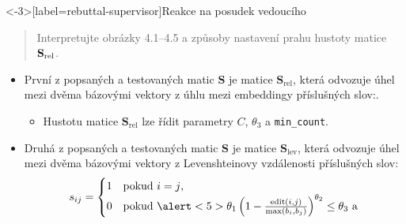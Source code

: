 \documentclass[aspectratio=169,t]{beamer}
\begin{document}
\begin{frame}<-3>[label=rebuttal-supervisor]{Reakce na posudek vedoucího}
\vspace*{-.1cm}
\begin{quote}
\alert<1>{Interpretujte obrázky 4.1--4.5} a způsoby nastavení prahu
\alert<1>{hustoty matice $\mathbf{S}_{\text{\textup{rel}}}$}.
\end{quote}
\vspace*{-.1cm}
\begin{itemize}
  \item<2-> První z popsaných a testovaných matic $\mathbf S$ je \alert<2>{matice
    $\mathbf{S}_{\text{rel}}$}, která \alert<2>{odvozuje úhel mezi dvěma
    bázovými vektory z úhlu mezi embeddingy příslušných slov}:.
    \begin{itemize}
      \item<3-> \alert<3>{Hustotu} matice $\mathbf{S}_{\text{rel}}$ \alert<3>{lze
        řídit parametry $C$, $\theta_3$ a \texttt{min\_count}}.
    \end{itemize}
  \item<4-> Druhá z popsaných a testovaných matic $\mathbf S$ je \alert<4>{matice
    $\mathbf{S}_{\text{lev}}$}, která \alert<4>{odvozuje úhel mezi dvěma
    bázovými vektory z Levenshteinovy vzdálenosti příslušných slov}:
    \begin{equation*}
      s_{ij} = \begin{cases}
        1 & \text{pokud }i = j\text{,} \\
        0 & \text{pokud }\alert<5>{\theta_1\left(1-\frac{\operatorname{edit}(i, j)}{\max(b_i, b_j)}\right)^{\theta_2}\leq\theta_3}\text{ a} \\

\end{cases}
\end{equation*}
\end{itemize}
\end{frame}
\end{document}
